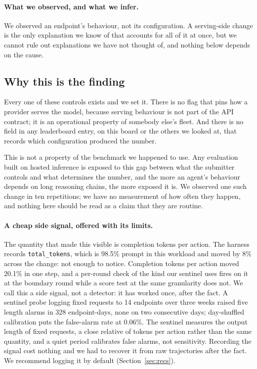\paragraph{What we observed, and what we infer.} We observed an endpoint's
behaviour, not its configuration. A serving-side change is the only explanation
we know of that accounts for all of it at once, but we cannot rule out
explanations we have not thought of, and nothing below depends on the cause.

\subsection{Why this is the finding}

Every one of these controls exists and we set it. There is no flag that pins
how a provider serves the model, because serving behaviour is not part of the
API contract; it is an operational property of somebody else's fleet. And there
is no field in any leaderboard entry, on this board or the others we looked at,
that records which configuration produced the number.

This is not a property of the benchmark we happened to use. Any evaluation
built on hosted inference is exposed to this gap between what the submitter
controls and what determines the number, and the more an agent's behaviour
depends on long reasoning chains, the more exposed it is. We observed one such
change in ten repetitions; we have no measurement of how often they happen,
and nothing here should be read as a claim that they are routine.

\paragraph{A cheap side signal, offered with its limits.} The quantity that
made this visible is completion tokens per action. The harness records
\texttt{total\_tokens}, which is 98.5\% prompt in this workload and moved by
8\% across the change: not enough to notice. Completion tokens per action moved
20.1\% in one step, and a per-round check of the kind our sentinel uses fires
on it at the boundary round while a score test at the same granularity does
not. We call this a side signal, not a detector: it has
worked once, after the fact. A sentinel probe logging fixed requests to 14
endpoints over three weeks raised five length alarms in 328 endpoint-days, none
on two consecutive days; day-shuffled calibration puts the false-alarm rate at
0.06\%. The sentinel measures the output length of fixed requests, a close
relative of tokens per action rather than the same quantity, and a quiet period
calibrates false alarms, not sensitivity. Recording the signal cost nothing
and we had to recover it from raw trajectories after the fact. We recommend
logging it by default (Section~\ref{sec:recs}).
